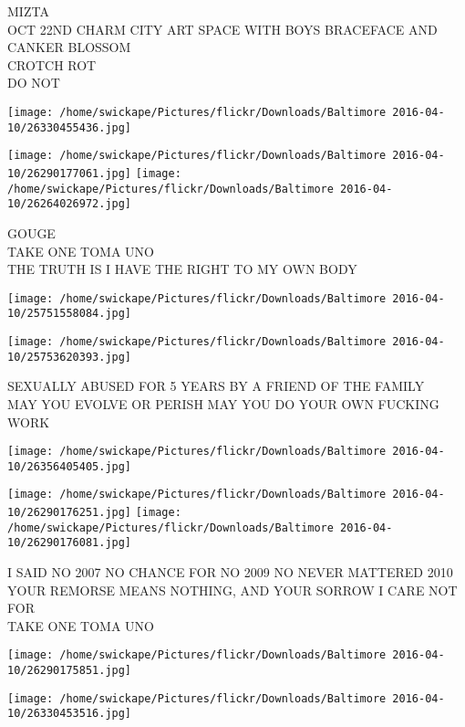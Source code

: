 \documentclass[10pt,letterpaper]{article}
\begin{document}
MIZTA\\
OCT 22ND CHARM CITY ART SPACE WITH BOYS BRACEFACE AND CANKER BLOSSOM\\
CROTCH ROT\\
DO NOT
\pagebreak

\texttt{[image: /home/swickape/Pictures/flickr/Downloads/Baltimore 2016-04-10/26330455436.jpg]}

\vspace{0.25in}
\texttt{[image: /home/swickape/Pictures/flickr/Downloads/Baltimore 2016-04-10/26290177061.jpg]}
\texttt{[image: /home/swickape/Pictures/flickr/Downloads/Baltimore 2016-04-10/26264026972.jpg]}

GOUGE\\
TAKE ONE TOMA UNO\\
THE TRUTH IS I HAVE THE RIGHT TO MY OWN BODY
\pagebreak

\texttt{[image: /home/swickape/Pictures/flickr/Downloads/Baltimore 2016-04-10/25751558084.jpg]}

\vspace{0.25in}
\texttt{[image: /home/swickape/Pictures/flickr/Downloads/Baltimore 2016-04-10/25753620393.jpg]}

SEXUALLY ABUSED FOR 5 YEARS BY A FRIEND OF THE FAMILY\\
MAY YOU EVOLVE OR PERISH MAY YOU DO YOUR OWN FUCKING WORK
\pagebreak

\texttt{[image: /home/swickape/Pictures/flickr/Downloads/Baltimore 2016-04-10/26356405405.jpg]}

\vspace{0.25in}
\texttt{[image: /home/swickape/Pictures/flickr/Downloads/Baltimore 2016-04-10/26290176251.jpg]}
\texttt{[image: /home/swickape/Pictures/flickr/Downloads/Baltimore 2016-04-10/26290176081.jpg]}

I SAID NO 2007 NO CHANCE FOR NO 2009 NO NEVER MATTERED 2010\\
YOUR REMORSE MEANS NOTHING, AND YOUR SORROW I CARE NOT FOR\\
TAKE ONE TOMA UNO
\pagebreak

\texttt{[image: /home/swickape/Pictures/flickr/Downloads/Baltimore 2016-04-10/26290175851.jpg]}

\vspace{0.25in}
\texttt{[image: /home/swickape/Pictures/flickr/Downloads/Baltimore 2016-04-10/26330453516.jpg]}
\end{document}
